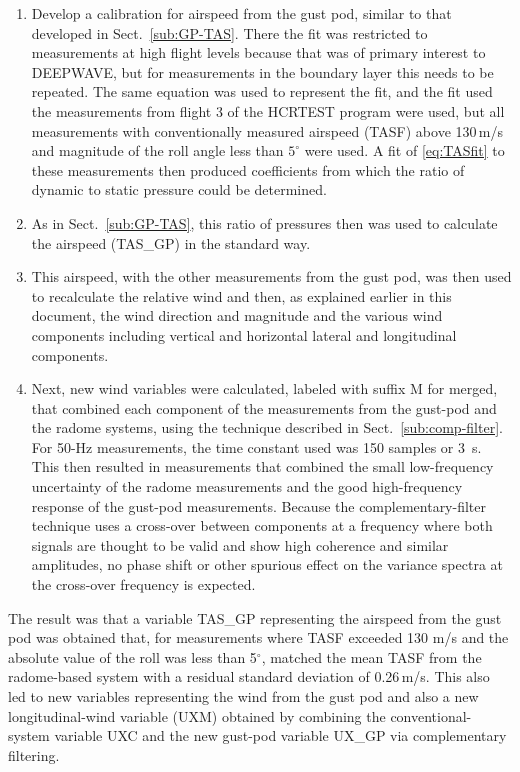\documentclass[12pt,twoside,english]{article}\usepackage[]{graphicx}\usepackage[]{color}
\let\OrgIndex\index
\renewcommand*{\index}[1]{\OrgIndex{#1}}
\begin{document}
{{\begin{appendices}
\begin{enumerate}
\item Develop a calibration for airspeed from the gust pod, similar to that developed in Sect.~\ref{sub:GP-TAS}. There the fit was restricted to measurements at high flight levels because that was of primary interest to DEEPWAVE, but for measurements in the boundary layer this needs to be repeated. The same equation was used to represent the fit, and the fit used the measurements from flight 3 of the HCRTEST program were used, but all measurements with conventionally measured airspeed (TASF) above 130\,m/s and magnitude of the roll angle less than $5^{\circ}$ were used. A fit of \eqref{eq:TASfit} to these measurements then produced coefficients from which the ratio of dynamic to static pressure could be determined. 
\item As in Sect.~\ref{sub:GP-TAS}, this ratio of pressures then was used to calculate the airspeed (TAS\_GP) in the standard way. 
\item This airspeed, with the other measurements from the gust pod, was then used to recalculate the relative wind and then, as explained earlier in this document, the wind direction and magnitude and the various wind components including vertical and horizontal lateral and longitudinal components. 
\item Next, new wind variables were calculated, labeled with suffix \textquotedbl{}M\textquotedbl{} for \textquotedbl{}merged\textquotedbl{}, that combined each component of the measurements from the gust-pod and the radome systems, using the technique described in Sect.~\ref{sub:comp-filter}. For 50-Hz measurements, the time constant used was 150 samples or 3~s. This then resulted in measurements that combined the small low-frequency uncertainty of the radome measurements and the good high-frequency response of the gust-pod measurements. Because the complementary-filter technique uses a cross-over between components at a frequency where both signals are thought to be valid and show high coherence and similar amplitudes, no phase shift or other spurious effect on the variance spectra at the cross-over frequency is expected. 
\end{enumerate}

The result was that a variable TAS\_GP representing the airspeed from the gust pod was obtained that, for measurements where TASF exceeded 130 m/s and the absolute value of the roll was less than 5$^{\circ}$, matched the mean TASF from the radome-based system with a residual standard deviation of 0.26\,m/s. This also led to new variables representing the wind from the gust pod and also a new longitudinal-wind variable (UXM) obtained by combining the conventional-system variable UXC and the new gust-pod variable UX\_GP via complementary filtering. 


\end{appendices}}}
\end{document}

